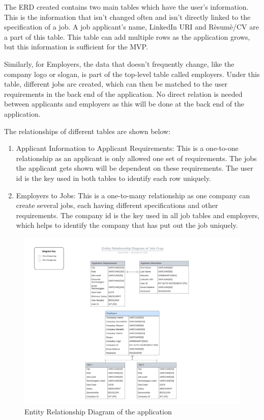 The ERD created contains two main tables which have the user's information. This is the information that isn't changed often and isn't directly linked to the specification of a job. A job applicant's name, LinkedIn URI and Rèsumè/CV are a part of this table. This table can add multiple rows as the application grows, but this information is sufficient for the MVP. 

Similarly, for Employers, the data that doesn't frequently change, like the company logo or slogan, is part of the top-level table called employers. Under this table, different jobs are created, which can then be matched to the user requirements in the back end of the application. No direct relation is needed between applicants and employers as this will be done at the back end of the application.

The relationships of different tables are shown below:
\begin{enumerate}
    \item Applicant Information to Applicant Requirements: This is a one-to-one relationship as an applicant is only allowed one set of requirements. The jobs the applicant gets shown will be dependent on these requirements. The user id is the key used in both tables to identify each row uniquely.
    \item Employers to Jobs: This is a one-to-many relationship as one company can create several jobs, each having different specifications and other requirements. The company id is the key used in all job tables and employers, which helps to identify the company that has put out the job uniquely.
\end{enumerate}


\begin{figure}
    \noindent
    \centering
    \includegraphics[width = 140mm]{Figures/ERD.pdf}
    \decoRule
    \caption[Entity Relationship Diagram]{Entity Relationship Diagram of the application}
    \label{fig: Entity Relationship Diagram}
\end{figure}

